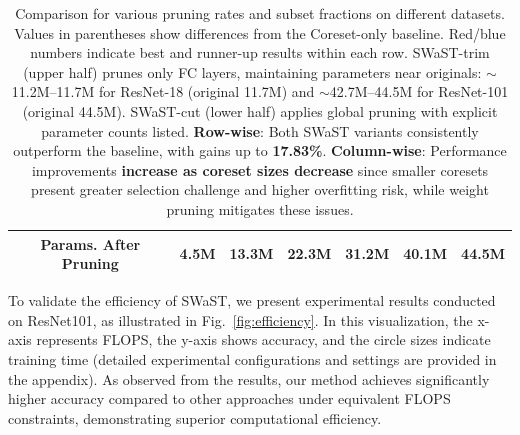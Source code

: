 \begin{table}[!t]
{\begin{tabular}{lcccccccc}
    \multicolumn{3}{c}{\textbf{Params. After Pruning}} & 4.5M & 13.3M & 22.3M & 31.2M & 40.1M & 44.5M \\ \hline
    \end{tabular}} 
    \caption{Comparison for various pruning rates and subset fractions on different datasets. Values in parentheses show differences from the Coreset-only baseline. {\color{red}Red}/{\color{blue}blue} numbers indicate best and runner-up results within each row.  SWaST-trim (upper half) prunes only FC layers, maintaining parameters near originals: $\sim$11.2M--11.7M for ResNet-18 (original 11.7M) and $\sim$42.7M--44.5M for ResNet-101 (original 44.5M). SWaST-cut (lower half) applies global pruning with explicit parameter counts listed.  \textbf{Row-wise}: Both SWaST variants consistently outperform the baseline, with gains up to \textbf{17.83\%}. 
    \textbf{Column-wise}: Performance improvements \textbf{increase as coreset sizes decrease} since smaller coresets present greater selection challenge and higher overfitting risk, while weight
    pruning mitigates these issues.
    }
    \label{tab:tab1}
\end{table}

To validate the efficiency of SWaST, we present experimental results conducted on ResNet101, as illustrated in Fig.~\ref{fig:efficiency}. In this visualization, the x-axis represents FLOPS, the y-axis shows accuracy, and the circle sizes indicate training time (detailed experimental configurations and settings are provided in the appendix). As observed from the results, our method achieves significantly higher accuracy compared to other approaches under equivalent FLOPS constraints, demonstrating superior computational efficiency.

